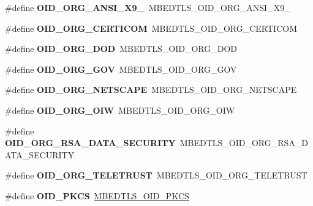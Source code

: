 \begin{DoxyCompactItemize}
\#define {\bfseries O\+I\+D\+\_\+\+O\+R\+G\+\_\+\+A\+N\+S\+I\+\_\+\+X9\+\_}~M\+B\+E\+D\+T\+L\+S\+\_\+\+O\+I\+D\+\_\+\+O\+R\+G\+\_\+\+A\+N\+S\+I\+\_\+\+X9\+\_
\item 
\mbox{\label{compat-1_83_8h_a0a3d78b1d90564e21bec9b8e1f417f59}} 
\#define {\bfseries O\+I\+D\+\_\+\+O\+R\+G\+\_\+\+C\+E\+R\+T\+I\+C\+OM}~M\+B\+E\+D\+T\+L\+S\+\_\+\+O\+I\+D\+\_\+\+O\+R\+G\+\_\+\+C\+E\+R\+T\+I\+C\+OM
\item 
\mbox{\label{compat-1_83_8h_a1c0faa65431b3790d1248edb74ac0489}} 
\#define {\bfseries O\+I\+D\+\_\+\+O\+R\+G\+\_\+\+D\+OD}~M\+B\+E\+D\+T\+L\+S\+\_\+\+O\+I\+D\+\_\+\+O\+R\+G\+\_\+\+D\+OD
\item 
\mbox{\label{compat-1_83_8h_ad91e74eb131ed59d428f1b2c7f7dd7f8}} 
\#define {\bfseries O\+I\+D\+\_\+\+O\+R\+G\+\_\+\+G\+OV}~M\+B\+E\+D\+T\+L\+S\+\_\+\+O\+I\+D\+\_\+\+O\+R\+G\+\_\+\+G\+OV
\item 
\mbox{\label{compat-1_83_8h_ab22c0f0fe09851fc6e510ce9a989d2f5}} 
\#define {\bfseries O\+I\+D\+\_\+\+O\+R\+G\+\_\+\+N\+E\+T\+S\+C\+A\+PE}~M\+B\+E\+D\+T\+L\+S\+\_\+\+O\+I\+D\+\_\+\+O\+R\+G\+\_\+\+N\+E\+T\+S\+C\+A\+PE
\item 
\mbox{\label{compat-1_83_8h_a6ac5548c91277435950a0ec3a7bef39e}} 
\#define {\bfseries O\+I\+D\+\_\+\+O\+R\+G\+\_\+\+O\+IW}~M\+B\+E\+D\+T\+L\+S\+\_\+\+O\+I\+D\+\_\+\+O\+R\+G\+\_\+\+O\+IW
\item 
\mbox{\label{compat-1_83_8h_ab6e4b7ca69e303951bfe5216ed2a044a}} 
\#define {\bfseries O\+I\+D\+\_\+\+O\+R\+G\+\_\+\+R\+S\+A\+\_\+\+D\+A\+T\+A\+\_\+\+S\+E\+C\+U\+R\+I\+TY}~M\+B\+E\+D\+T\+L\+S\+\_\+\+O\+I\+D\+\_\+\+O\+R\+G\+\_\+\+R\+S\+A\+\_\+\+D\+A\+T\+A\+\_\+\+S\+E\+C\+U\+R\+I\+TY
\item 
\mbox{\label{compat-1_83_8h_a55494632e5df77e11032d1f135b73008}} 
\#define {\bfseries O\+I\+D\+\_\+\+O\+R\+G\+\_\+\+T\+E\+L\+E\+T\+R\+U\+ST}~M\+B\+E\+D\+T\+L\+S\+\_\+\+O\+I\+D\+\_\+\+O\+R\+G\+\_\+\+T\+E\+L\+E\+T\+R\+U\+ST
\item 
\mbox{\label{compat-1_83_8h_a4eb6163dc6483ad673611f62361f1b96}} 
\#define {\bfseries O\+I\+D\+\_\+\+P\+K\+CS}~\mbox{\hyperlink{oid_8h_af14ca6f25be2df68aefb743374bc67c1}{M\+B\+E\+D\+T\+L\+S\+\_\+\+O\+I\+D\+\_\+\+P\+K\+CS}}

\end{DoxyCompactItemize}
